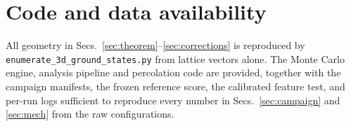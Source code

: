 \documentclass[11pt]{article}
\begin{document}
\section*{Code and data availability}

All geometry in Secs.~\ref{sec:theorem}--\ref{sec:corrections} is reproduced by
\texttt{enumerate\_3d\_ground\_states.py} from lattice vectors alone. The Monte
Carlo engine, analysis pipeline and percolation code are provided, together
with the campaign manifests, the frozen reference score, the calibrated
feature test, and per-run logs sufficient to reproduce every number in
Secs.~\ref{sec:campaign} and \ref{sec:mech} from the raw configurations.
\end{document}

